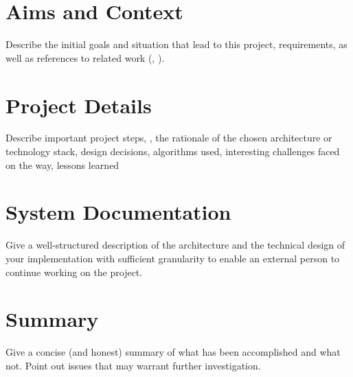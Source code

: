 \documentclass[english,notitlepage,smartquotes]{hgbreport}
\begin{document}
\chapter{Aims and Context}

Describe the initial goals and situation that lead to this project,
requirements, as well as references to related work (\eg, \cite{Higham2020}).

\chapter{Project Details}

Describe important project steps, \eg, the rationale of the chosen architecture
or technology stack, design decisions, algorithms used, interesting challenges
faced on the way, lessons learned \etc

\chapter{System Documentation}

Give a well-structured description of the architecture and the technical design
of your implementation with sufficient granularity to enable an external person
to continue working on the project.

\chapter{Summary}

Give a concise (and honest) summary of what has been accomplished and what not. 
Point out issues that may warrant further investigation.

\appendix                                                   %
\end{document}
